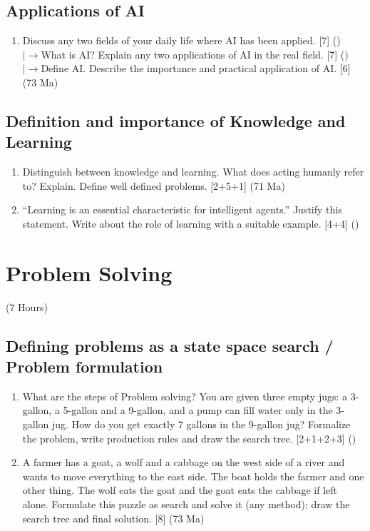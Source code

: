 \documentclass[12pt]{article}
\newcommand{\lb}{\\$\left|\rightarrow\right.$}
\begin{document}
  \subsection{Applications of AI}
    \begin{enumerate}[topsep=0pt, noitemsep]
      \item Discuss any two fields of your daily life where AI has been applied. \hfill [7] ()
        \lb What is AI? Explain any two applications of AI in the real field. \hfill [7] ()
        \lb Define AI. Describe the importance and practical application of AI. \hfill [6] (73 Ma)
    \end{enumerate}

  \subsection{Definition and importance of Knowledge and Learning}
    \begin{enumerate}[topsep=0pt, noitemsep]
      \item Distinguish between knowledge and learning. What does acting humanly refer to? Explain. Define well defined problems. \hfill [2+5+1] (71 Ma)

      \item ``Learning is an essential characteristic for intelligent agents.'' Justify this statement. Write about the role of learning with a suitable example. \hfill [4+4] ()
    \end{enumerate}

\pagebreak
\section{Problem Solving}
\begin{center}(7 Hours)\end{center}

  \subsection{Defining problems as a state space search / Problem formulation}
    \begin{enumerate}[topsep=0pt, noitemsep]
      \item What are the steps of Problem solving? You are given three empty jugs: a 3-gallon, a 5-gallon and a 9-gallon, and a pump can fill water only in the 3-gallon jug. How do you get exactly 7 gallons in the 9-gallon jug? Formalize the problem, write production rules and draw the search tree. \hfill [2+1+2+3] ()

      \item A farmer has a goat, a wolf and a cabbage on the west side of a river and wants to move everything to the east side. The boat holds the farmer and one other thing. The wolf eats the goat and the goat eats the cabbage if left alone. Formulate this puzzle as search and solve it (any method); draw the search tree and final solution. \hfill [8] (73 Ma)
    \end{enumerate}
\end{document}
